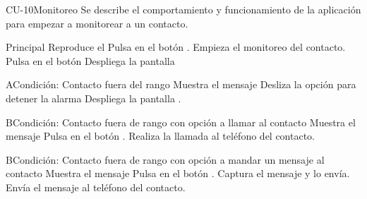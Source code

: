 \begin{UseCase}{CU-10}{Monitoreo}{
	Se describe el comportamiento y funcionamiento de la aplicación para empezar a monitorear a un contacto.}
	\end{UseCase}
	\begin{UCtrayectoria}{Principal}
		\UCpaso[\UCsist] Reproduce el 
		\UCpaso[\UCactor] Pulsa en el botón .
		\UCpaso[\UCsist] Empieza el monitoreo del contacto.   
		\UCpaso[\UCactor] Pulsa en el botón 
		\UCpaso[\UCsist] Despliega la pantalla 
	\end{UCtrayectoria}
	\begin{UCtrayectoriaA}{A}{Condición: Contacto fuera del rango}
		\UCpaso[\UCsist] Muestra el mensaje 		
		\UCpaso[\UCactor] Desliza la opción  para detener la alarma
		\UCpaso[\UCsist] Despliega la pantalla .
	\end{UCtrayectoriaA}

	\begin{UCtrayectoriaA}{B}{Condición: Contacto fuera de rango con opción a llamar al contacto}
		\UCpaso[\UCsist] Muestra el mensaje 
		\UCpaso[\UCactor] Pulsa en el botón .
		\UCpaso[\UCsist] Realiza la llamada al teléfono del contacto.
	\end{UCtrayectoriaA}

	\begin{UCtrayectoriaA}{B}{Condición: Contacto fuera de rango con opción a mandar un mensaje al contacto}
		\UCpaso[\UCsist] Muestra el mensaje 
		\UCpaso[\UCactor] Pulsa en el botón .
		\UCpaso[\UCactor] Captura el mensaje y lo envía.
		\UCpaso[\UCsist] Envía el mensaje al teléfono del contacto.
	\end{UCtrayectoriaA}